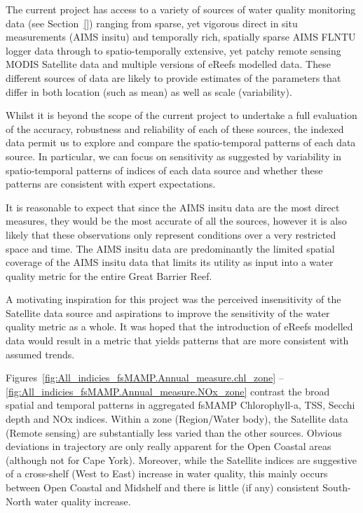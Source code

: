 The current project has access to a variety of sources of water quality monitoring data (see
Section~\ref{}) ranging from sparse, yet vigorous direct in situ measurements (AIMS insitu) and
temporally rich, spatially sparse AIMS FLNTU logger data through to spatio-temporally extensive, yet
patchy remote sensing MODIS Satellite data and multiple versions of eReefs modelled data.  These
different sources of data are likely to provide estimates of the parameters that differ in both
location (such as mean) as well as scale (variability).

Whilst it is beyond the scope of the current project to undertake a full evaluation of the accuracy,
robustness and reliability of each of these sources, the indexed data permit us to explore and
compare the spatio-temporal patterns of each data source.  In particular, we can focus on
sensitivity as suggested by variability in spatio-temporal patterns of indices of each data source
and whether these patterns are consistent with expert expectations.

It is reasonable to expect that since the AIMS insitu data are the most direct measures, they would
be the most accurate of all the sources, however it is also likely that these observations only
represent conditions over a very restricted space and time.  The AIMS insitu data are predominantly
the limited spatial coverage of the AIMS insitu data that limits its utility as input into a water
quality metric for the entire Great Barrier Reef.

A motivating inspiration for this project was the perceived insensitivity of the Satellite data
source and aspirations to improve the sensitivity of the water quality metric as a whole.  It was
hoped that the introduction of eReefs modelled data would result in a metric that yields patterns
that are more consistent with assumed trends.

Figures~\ref{fig:All_indicies_fsMAMP.Annual_measure.chl_zone} --
\ref{fig:All_indicies_fsMAMP.Annual_measure.NOx_zone} contrast the broad spatial and temporal
patterns in aggregated fsMAMP Chlorophyll-a, TSS, Secchi depth and NOx indices.  Within a zone
(Region/Water body), the Satellite data (Remote sensing) are substantially less varied than the
other sources.  Obvious deviations in trajectory are only really apparent for the Open Coastal areas
(although not for Cape York).  Moreover, while the Satellite indices are suggestive of a cross-shelf
(West to East) increase in water quality, this mainly occurs between Open Coastal and Midshelf and
there is little (if any) consistent South-North water quality increase.

